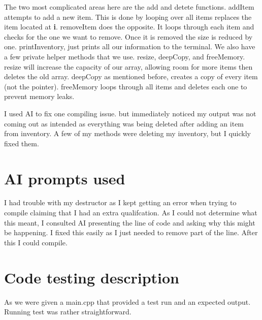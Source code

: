 \documentclass[11pt]{article}
\begin{document}
The two most complicated areas here are the add and detete functions. addItem attempts to add a new item. This is done by looping over all items replaces the item located at \textbf{i}. removeItem does the opposite. It loops through each item and checks for the one we want to remove. Once it is removed the size is reduced by one. printInventory, just prints all our information to the terminal. We also have a few private helper methods that we use. resize, deepCopy, and freeMemory. resize will increase the capacity of our array, allowing room for more items then deletes the old array. deepCopy as mentioned before, creates a copy of every item (not the pointer). freeMemory loops through all items and deletes each one to prevent memory leaks.

I used AI to fix one compiling issue. but immediately noticed my output was not coming out as intended as everything was being deleted after adding an item from inventory. A few of my methods were deleting my inventory, but I quickly fixed them.
\section{AI prompts used}
\label{sec:org3b47637}
I had trouble with my destructor as I kept getting an error when trying to compile claiming that I had an extra qualifcation. As I could not determine what this meant, I consulted AI presenting the line of code and asking why this might be happening. I fixed this easily as I just needed to remove part of the line. After this I could compile.
\section{Code testing description}
\label{sec:org135625a}
As we were given a main.cpp that provided a test run and an expected output. Running test was rather straightforward.
\end{document}
